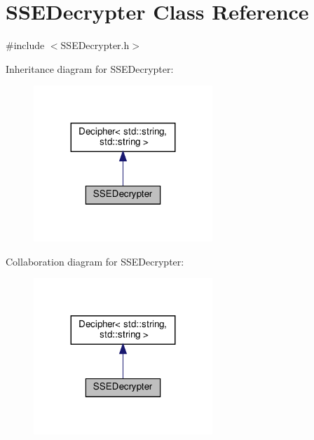 \hypertarget{classSSEDecrypter}{}\section{S\+S\+E\+Decrypter Class Reference}
\label{classSSEDecrypter}


{\ttfamily \#include $<$S\+S\+E\+Decrypter.\+h$>$}



Inheritance diagram for S\+S\+E\+Decrypter\+:\nopagebreak
\begin{figure}[H]
\begin{center}
\leavevmode
\includegraphics[width=191pt]{classSSEDecrypter__inherit__graph}
\end{center}
\end{figure}


Collaboration diagram for S\+S\+E\+Decrypter\+:\nopagebreak
\begin{figure}[H]
\begin{center}
\leavevmode
\includegraphics[width=191pt]{classSSEDecrypter__coll__graph}
\end{center}
\end{figure}
